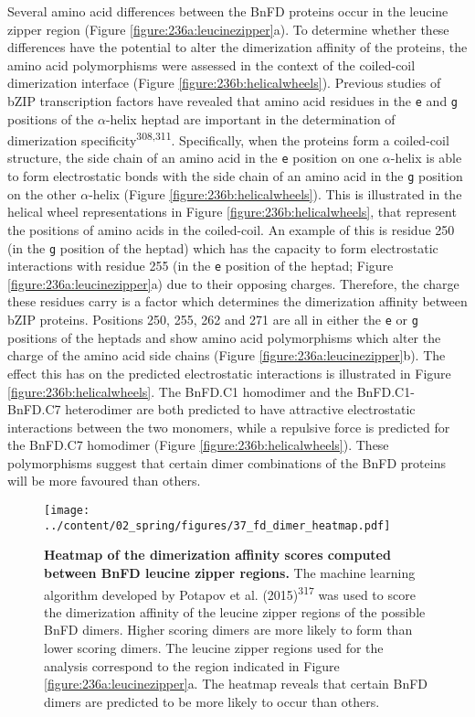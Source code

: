 \documentclass[12pt,]{book}
\begin{document}
Several amino acid differences between the BnFD proteins occur in the
leucine zipper region (Figure \ref{figure:236a:leucinezipper}a). To
determine whether these differences have the potential to alter the
dimerization affinity of the proteins, the amino acid polymorphisms were
assessed in the context of the coiled-coil dimerization interface
(Figure \ref{figure:236b:helicalwheels}). Previous studies of bZIP
transcription factors have revealed that amino acid residues in the
\texttt{e} and \texttt{g} positions of the \(\alpha\)-helix heptad are
important in the determination of dimerization
specificity\textsuperscript{308,311}. Specifically, when the proteins
form a coiled-coil structure, the side chain of an amino acid in the
\texttt{e} position on one \(\alpha\)-helix is able to form
electrostatic bonds with the side chain of an amino acid in the
\texttt{g} position on the other \(\alpha\)-helix (Figure
\ref{figure:236b:helicalwheels}). This is illustrated in the helical
wheel representations in Figure \ref{figure:236b:helicalwheels}, that
represent the positions of amino acids in the coiled-coil. An example of
this is residue 250 (in the \texttt{g} position of the heptad) which has
the capacity to form electrostatic interactions with residue 255 (in the
\texttt{e} position of the heptad; Figure
\ref{figure:236a:leucinezipper}a) due to their opposing charges.
Therefore, the charge these residues carry is a factor which determines
the dimerization affinity between bZIP proteins. Positions 250, 255, 262
and 271 are all in either the \texttt{e} or \texttt{g} positions of the
heptads and show amino acid polymorphisms which alter the charge of the
amino acid side chains (Figure \ref{figure:236a:leucinezipper}b). The
effect this has on the predicted electrostatic interactions is
illustrated in Figure \ref{figure:236b:helicalwheels}. The BnFD.C1
homodimer and the BnFD.C1-BnFD.C7 heterodimer are both predicted to have
attractive electrostatic interactions between the two monomers, while a
repulsive force is predicted for the BnFD.C7 homodimer (Figure
\ref{figure:236b:helicalwheels}). These polymorphisms suggest that
certain dimer combinations of the BnFD proteins will be more favoured
than others.

\begin{figure}[htbp]
\centering
\texttt{[image: ../content/02\_spring/figures/37\_fd\_dimer\_heatmap.pdf]}
\caption{\textbf{Heatmap of the dimerization affinity scores computed
between BnFD leucine zipper regions.} The machine learning algorithm
developed by Potapov et al. (2015)\textsuperscript{317} was used to
score the dimerization affinity of the leucine zipper regions of the
possible BnFD dimers. Higher scoring dimers are more likely to form than
lower scoring dimers. The leucine zipper regions used for the analysis
correspond to the region indicated in Figure
\ref{figure:236a:leucinezipper}a. The heatmap reveals that certain BnFD
dimers are predicted to be more likely to occur than
others.}\label{figure:237:bnafdheatmap}
\end{figure}
\end{document}
